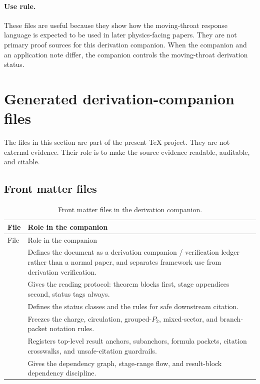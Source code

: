 \paragraph{Use rule.}
These files are useful because they show how the moving-throat response language is expected to be used in later physics-facing papers.  They are not primary proof sources for this derivation companion.  When the companion and an application note differ, the companion controls the moving-throat derivation status.

\section{Generated derivation-companion files}
\label{sec:generated-companion-files}

The files in this section are part of the present \TeX{} project.  They are not external evidence.  Their role is to make the source evidence readable, auditable, and citable.

\subsection{Front matter files}
\label{subsec:frontmatter-files}

\begin{longtable}{@{}L{0.36\textwidth}L{0.52\textwidth}@{}}
\caption{Front matter files in the derivation companion.}\label{tab:frontmatter-files}\\
\toprule
File & Role in the companion \\
\midrule
\endfirsthead
\toprule
File & Role in the companion \\
\midrule
\endhead
{} & Defines the document as a derivation companion / verification ledger rather than a normal paper, and separates framework use from derivation verification. \\
\addlinespace
{} & Gives the reading protocol: theorem blocks first, stage appendices second, status tags always. \\
\addlinespace
{} & Defines the status classes and the rules for safe downstream citation. \\
\addlinespace
{} & Freezes the charge, circulation, grouped-\(P_2\), mixed-sector, and branch-packet notation rules. \\
\addlinespace
{} & Registers top-level result anchors, subanchors, formula packets, citation crosswalks, and unsafe-citation guardrails. \\
\addlinespace
{} & Gives the dependency graph, stage-range flow, and result-block dependency discipline. \\
\bottomrule
\end{longtable}

